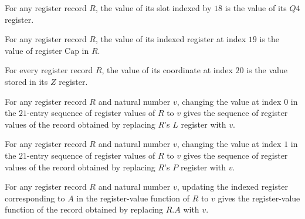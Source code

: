\begin{lemma}
\label{Complexity.Codec.Regs.val_Q4}
\leanok
{}
For any register record $R$, the value of its slot indexed by $18$ is the value of its
$Q4$ register.
\end{lemma}

\begin{lemma}
\label{Complexity.Codec.Regs.val_Cap}
\leanok
{}
For any register record $R$, the value of its indexed register at index $19$ is the
value of register $\mathrm{Cap}$ in $R$.
\end{lemma}

\begin{lemma}
\label{Complexity.Codec.Regs.val_Z}
\leanok
{}
For every register record $R$, the value of its coordinate at index $20$ is the value
stored in its $Z$ register.
\end{lemma}

\begin{lemma}
\label{Complexity.Codec.Regs.upd_L}
\leanok
{}
For any register record $R$ and natural number $v$, changing the value at index $0$ in
the $21$-entry sequence of register values of $R$ to $v$ gives the sequence of register
values of the record obtained by replacing $R$'s $L$ register with $v$.
\end{lemma}

\begin{lemma}
\label{Complexity.Codec.Regs.upd_P}
\leanok
{}
For any register record $R$ and natural number $v$, changing the value at index $1$ in
the $21$-entry sequence of register values of $R$ to $v$ gives the sequence of register
values of the record obtained by replacing $R$'s $P$ register with $v$.
\end{lemma}

\begin{lemma}
\label{Complexity.Codec.Regs.upd_A}
\leanok
{}
For any register record $R$ and natural number $v$, updating the indexed register
corresponding to $A$ in the register-value function of $R$ to $v$ gives the
register-value function of the record obtained by replacing $R.A$ with $v$.
\end{lemma}

